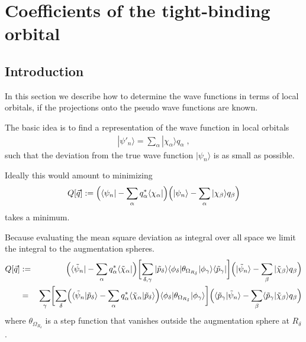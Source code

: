\documentclass[11pt,a4paper]{report}
\begin{document}
\section{Coefficients of the tight-binding orbital}
\subsection{Introduction}
In this section we describe how to determine the wave functions in
terms of local orbitals, if the projections onto the pseudo wave
functions are known.

The basic idea is to find a representation of the wave function in
local orbitals
\begin{eqnarray}
|\psi'_n\rangle=\sum_\alpha |\chi_\alpha\rangle q_\alpha\;,
\end{eqnarray}
such that the deviation from the true wave function $|\psi_n\rangle$
is as small as possible.

Ideally this would amount to minimizing
\begin{eqnarray*}
Q[\vec{q}]:=\Bigl(\langle\psi_n|-\sum_\alpha q^*_\alpha\langle\chi_\alpha|\Bigr)
\Bigl(|\psi_n\rangle-\sum_\alpha |\chi_\beta\rangle q_\beta\Bigr)
\end{eqnarray*}
takes a minimum.

Because evaluating the mean square deviation as integral over all
space we limit the integral to the augmentation spheres.
\begin{eqnarray}
Q[\vec{q}]&:=&
\Bigl(\langle\tilde{\psi}_n|
-\sum_\alpha q^*_\alpha\langle\tilde{\chi}_\alpha|\Bigr)
\biggl[\sum_{\delta,\gamma}|\tilde{p}_\delta\rangle\langle\phi_\delta|
\theta_{\Omega_{R_\delta}}|\phi_\gamma\rangle\langle\tilde{p}_\gamma|\biggr]
\Bigl(|\tilde{\psi}_n\rangle
-\sum_\beta |\tilde{\chi}_\beta\rangle q_\beta\Bigr)
\nonumber\\
&=&
\sum_{\gamma}
\biggl[
\sum_{\delta}
\Bigl(\langle\tilde{\psi}_n|\tilde{p}_\delta\rangle
-\sum_\alpha q^*_\alpha\langle\tilde{\chi}_\alpha|\tilde{p}_\delta\rangle\Bigr)
\langle\phi_\delta|\theta_{\Omega_{R_\delta}}|\phi_\gamma\rangle
\biggr]
\Bigl(\langle\tilde{p}_\gamma|\tilde{\psi}_n\rangle
-\sum_\beta \langle\tilde{p}_\gamma|\tilde{\chi}_\beta\rangle q_\beta\Bigr)
\end{eqnarray}
where $\theta_{\Omega_{R_\delta}}$ is a step function that vanishes
outside the augmentation sphere at $R_\delta$.
\end{document}
